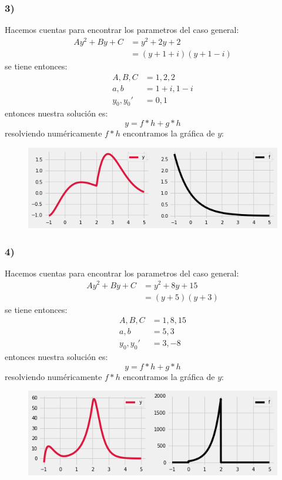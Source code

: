 \documentclass{article}
\begin{document}
\begin{tcolorbox}[breakable]
    \subsubsection*{3)}
    Hacemos cuentas para encontrar los parametros del caso general:
    \begin{align*}
        Ay^2 + By + C 
        &= y^2 + 2y + 2 \\
        &= (y+1+i)(y+1-i)
    \end{align*}
    se tiene entonces:
    \begin{align*}
        A, B, C &= 1, 2, 2 \\ 
        a,b &= 1+i, 1-i \\  
        y_0, y_0' &= 0,1
    \end{align*}    
    entonces nuestra solución es:
    \[ y = f*h + g*h \]
    resolviendo numéricamente $f*h$ encontramos la gráfica de $y$:
    \begin{figure}[H]
        \centering
        \includegraphics[scale=0.7]{images/p1_3.png}
    \end{figure}

    \subsubsection*{4)}
    Hacemos cuentas para encontrar los parametros del caso general:
    \begin{align*}
        Ay^2 + By + C 
        &= y^2 + 8y + 15 \\
        &= (y+5)(y+3)
    \end{align*}
    se tiene entonces:
    \begin{align*}
        A, B, C &= 1,8,15 \\
        a,b &= 5,3 \\ 
        y_0, y_0' &= 3,-8
    \end{align*}
    entonces nuestra solución es:
    \[ y = f*h + g*h \]
    resolviendo numéricamente $f*h$ encontramos la gráfica de $y$:
    \begin{figure}[H]
        \centering
        \includegraphics[scale=0.7]{images/p1_4.png}
    \end{figure}

\end{tcolorbox}
\end{document}
